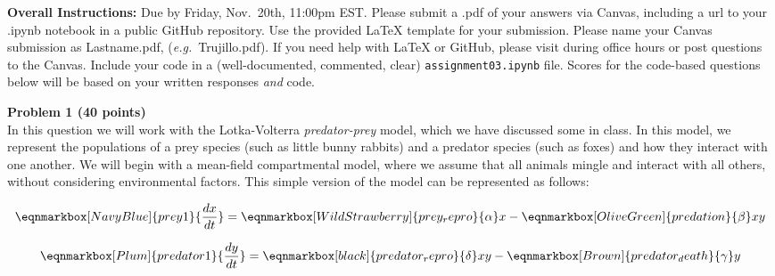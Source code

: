 \documentclass{article}
\newenvironment{problem}[2][Problem]
    { \begin{mdframed}[backgroundcolor=gray!20] \textbf{#1 #2} \\}
    {  \end{mdframed}}
\begin{document}
\textbf{Overall Instructions:}
Due by Friday, Nov.~20th, 11:00pm EST. Please submit a .pdf of your answers via Canvas, including a url to your .ipynb notebook in a public GitHub repository. Use the provided \LaTeX{} template for your submission. Please name your Canvas submission as Lastname.pdf, (\textit{e.g.}~Trujillo.pdf). If you need help with \LaTeX{} or GitHub, please visit during office hours or post questions to the Canvas. Include your code in a (well-documented, commented, clear) \texttt{assignment03.ipynb} file. Scores for the code-based questions below will be based on your written responses \textit{and} code.

\begin{problem}{1 (40 points)}

In this question we will work with the Lotka-Volterra \textit{predator-prey} model, which we have discussed some in class. In this model, we represent the populations of a prey species (such as little bunny rabbits) and a predator species (such as foxes) and how they interact with one another. We will begin with a mean-field compartmental model, where we assume that all animals mingle and interact with all others, without considering environmental factors. This simple version of the model can be represented as follows:

\begin{equation*}
    \eqnmarkbox[NavyBlue]{prey1}{\frac{dx}{dt}} = 
    \eqnmarkbox[WildStrawberry]{prey_repro}{\alpha} x - 
    \eqnmarkbox[OliveGreen]{predation}{\beta} xy
\end{equation*}

\vspace{1em}

\begin{equation*}
    \eqnmarkbox[Plum]{predator1}{\frac{dy}{dt}} = 
    \eqnmarkbox[black]{predator_repro}{\delta} xy
    - \eqnmarkbox[Brown]{predator_death}{\gamma}y
\end{equation*}

\vspace{1em}


\end{problem}
\end{document}
